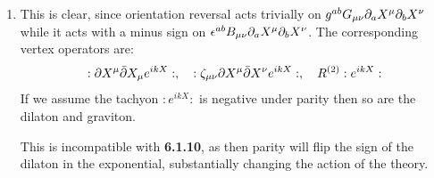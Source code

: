 \documentclass[11pt, class=article, crop=false]{standalone}
\begin{document}
\begin{enumerate}
	\item This is clear, since orientation reversal acts trivially on $g^{ab} G_{\mu \nu} \partial_a X^\mu \partial_b X^\nu$ while it acts with a minus sign on $\epsilon^{ab} B_{\mu \nu} \partial_a X^\mu \partial_b X^\nu$. The corresponding vertex operators are:
	\[
		:\partial X^\mu \bar {\partial} X_\mu e^{i k X}:, \quad   :\zeta_{\mu \nu} \partial X^{\mu} \bar {\partial} X^\nu e^{i k X}:, \quad R^{(2)} :e^{i k X}:
	\]
	If we assume the tachyon $:e^{i k X}:$ is negative under parity then so are the dilaton and graviton. 
	
	This is incompatible with \textbf{6.1.10}, as then parity will flip the sign of the dilaton in the exponential, substantially changing the action of the theory. 
	
\end{enumerate}

\end{document}
